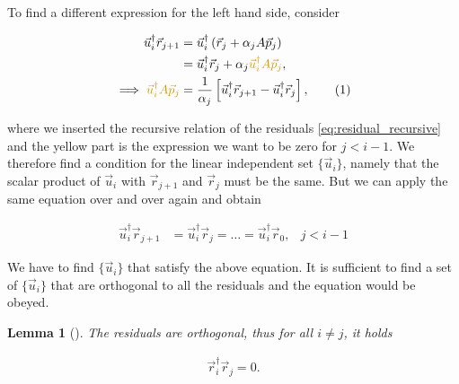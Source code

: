 \documentclass{article}
\newcommand\numberthis{\addtocounter{equation}{1}\tag{\theequation}}
\theoremstyle{plain} %
\newtheorem{lemma}[theorem]{Lemma}
\theoremstyle{convention} %
\theoremstyle{remark} %
\numberwithin{equation}{section}
\begin{document}
To find a different expression for the left hand side, consider

\begin{align*}
    \vec{u}_i^{\dagger} \vec{r}_{j+1} &= \vec{u}_i^{\dagger} \left( \vec{r}_j + \alpha_j A \vec{p}_j \right) \\
    &= \vec{u}_i^{\dagger} \vec{r}_j + \alpha_j \textcolor{cyellow}{\vec{u}_i^{\dagger} A \vec{p}_j}, \\
    \implies \textcolor{cyellow}{\vec{u}_i^{\dagger} A \vec{p}_j} &= \frac{1}{\alpha_j} \left[ \vec{u}_i^{\dagger} \vec{r}_{j+1} - \vec{u}_i^{\dagger} \vec{r}_j \right], \numberthis \label{eq:uiAdj}
\end{align*}

where we inserted the recursive relation of the residuals \eqref{eq:residual_recursive} and the \textcolor{cyellow}{yellow} part is the expression we want to be \textcolor{cyellow}{zero} for $j<i-1$. We therefore find a condition for the linear independent set $\{\vec{u}_i\}$, namely that the scalar product of $\vec{u}_i$ with $\vec{r}_{j+1}$ and $\vec{r}_{j}$ must be the same. But we can apply the same equation over and over again and obtain

\begin{align*}
    \vec{u}_i^{\dagger} \vec{r}_{j+1} &= \vec{u}_i^{\dagger} \vec{r}_j = \dots = \vec{u}_i^{\dagger} \vec{r}_0, &j<i-1
\end{align*}

We have to find $\{\vec{u}_i\}$ that satisfy the above equation. It is sufficient to find a set of $\{\vec{u}_i\}$ that are orthogonal to all the residuals and the equation would be obeyed.

\begin{lemma}[]
\label{lem:rorthogonality}
The residuals are orthogonal, thus for all $i \neq j$, it holds

\begin{align*}
    \vec{r}_i^{\dagger} \vec{r}_j = 0.
\end{align*}

\end{lemma}
\end{document}
